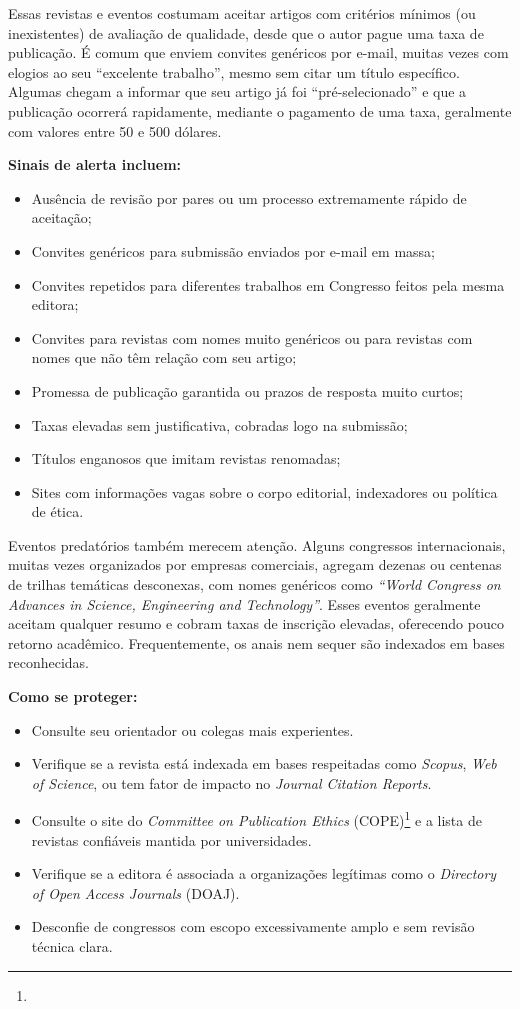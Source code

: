  Essas revistas e eventos costumam aceitar artigos com critérios mínimos (ou inexistentes) de avaliação de qualidade, desde que o autor pague uma taxa de publicação. 
 É comum que enviem convites genéricos por e-mail, muitas vezes com elogios ao seu ``excelente trabalho'', mesmo sem citar um título específico. 
 Algumas chegam a informar que seu artigo já foi ``pré-selecionado'' e que a publicação ocorrerá rapidamente, mediante o pagamento de uma taxa, geralmente com valores entre 50 e 500 dólares.

\textbf{Sinais de alerta incluem:}
\begin{itemize}
  \item Ausência de revisão por pares ou um processo extremamente rápido de aceitação;
  \item Convites genéricos para submissão enviados por e-mail em massa;
  \item Convites repetidos para diferentes trabalhos em Congresso feitos pela mesma editora;
  \item Convites para revistas com nomes muito genéricos ou para revistas com nomes que não têm relação com seu artigo;
  \item Promessa de publicação garantida ou prazos de resposta muito curtos;
  \item Taxas elevadas sem justificativa, cobradas logo na submissão;
  \item Títulos enganosos que imitam revistas renomadas;
  \item Sites com informações vagas sobre o corpo editorial, indexadores ou política de ética.
\end{itemize}

Eventos predatórios também merecem atenção. Alguns congressos internacionais, muitas vezes organizados por empresas comerciais, agregam dezenas ou centenas de trilhas temáticas desconexas, com nomes genéricos como \textit{``World Congress on Advances in Science, Engineering and Technology''}. 
Esses eventos geralmente aceitam qualquer resumo e cobram taxas de inscrição elevadas, oferecendo pouco retorno acadêmico. Frequentemente, os anais nem sequer são indexados em bases reconhecidas.

\textbf{Como se proteger:}
\begin{itemize}
  \item Consulte seu orientador ou colegas mais experientes.
  \item Verifique se a revista está indexada em bases respeitadas como \textit{Scopus}, \textit{Web of Science}, ou tem fator de impacto no \textit{Journal Citation Reports}.
  \item Consulte o site do \textit{Committee on Publication Ethics} (COPE)\footnote{} e a lista de revistas confiáveis mantida por universidades.
  \item Verifique se a editora é associada a organizações legítimas como o \textit{Directory of Open Access Journals} (DOAJ).
  \item Desconfie de congressos com escopo excessivamente amplo e sem revisão técnica clara.
\end{itemize}


